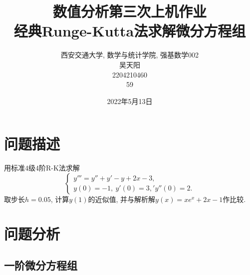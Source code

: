 \documentclass[12pt, a4paper, oneside]{ctexart}
\numberwithin{equation}{section}  %
\begin{document}
\title{数值分析第三次上机作业\\经典Runge-Kutta法求解微分方程组}
\author{
西安交通大学, 数学与统计学院, 强基数学002\\[1ex]
吴天阳\\[1ex]
2204210460\\[1ex]
59
}
\date{2022年5月13日}

\maketitle %
\tableofcontents %

\clearpage
\section{问题描述}
用标准$4$级$4$阶R-K法求解
\begin{equation}\label{eq-问题描述}
    \begin{cases}
        y''' = y'' + y' - y + 2x -3,\\
        y(0) = -1,\ y'(0) = 3,' y''(0) = 2.
    \end{cases}
\end{equation}
取步长$h=0.05$, 计算$y(1)$的近似值, 并与解析解$y(x) = xe^x+2x-1$作比较.
\section{问题分析}
\subsection{一阶微分方程组}
\end{document}
